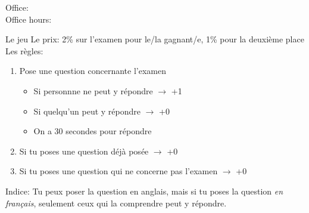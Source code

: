 \documentclass{beamer}
\subtitle[Révision, examen final]{Révision de l'examen final}
\begin{document}
  \begin{frame}
    \titlepage
    \tiny{Office: \\
          Office hours: }
  \end{frame}

  \begin{frame}{Le jeu}
    \alert{Le prix:} 2\% sur l'examen pour le/la gagnant/e, 1\% pour la deuxième place \\
    \vspace{0.25cm}
    \alert{Les règles:}
    \begin{enumerate}
      \item Pose une question concernante l'examen
      \begin{itemize}
        \item Si personnne ne peut y répondre $\to$ +1
        \item Si quelqu'un peut y répondre $\to$ +0
        \item On a \alert{30 secondes} pour répondre
      \end{itemize}
      \item Si tu poses une question déjà posée $\to$ +0
      \item Si tu poses une question qui ne concerne pas l'examen $\to$ +0
    \end{enumerate}
    \vspace{0.25cm}
    \alert{Indice:} Tu peux poser la question en anglais, mais si tu poses la question \emph{en français}, seulement ceux qui la comprendre peut y répondre.
  \end{frame}

\end{document}
